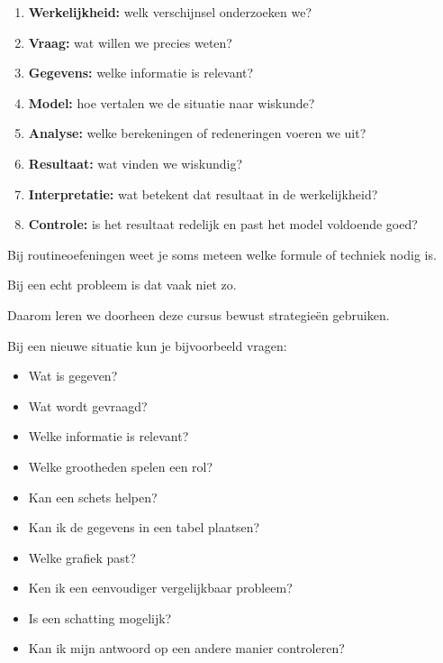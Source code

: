 \documentclass{ximera}
\begin{document}
\begin{oefening}{\oefU \ESS}
\begin{oefening}{\oefB \ESS}
\begin{opmerking}
\begin{enumerate}
  \item \textbf{Werkelijkheid:} welk verschijnsel onderzoeken we?
  \item \textbf{Vraag:} wat willen we precies weten?
  \item \textbf{Gegevens:} welke informatie is relevant?
  \item \textbf{Model:} hoe vertalen we de situatie naar wiskunde?
  \item \textbf{Analyse:} welke berekeningen of redeneringen voeren we uit?
  \item \textbf{Resultaat:} wat vinden we wiskundig?
  \item \textbf{Interpretatie:} wat betekent dat resultaat in de werkelijkheid?
  \item \textbf{Controle:} is het resultaat redelijk en past het model voldoende goed?
\end{enumerate}




Bij routineoefeningen weet je soms meteen welke formule of techniek
nodig is.

Bij een echt probleem is dat vaak niet zo.

Daarom leren we doorheen deze cursus bewust strategieën gebruiken.

Bij een nieuwe situatie kun je bijvoorbeeld vragen:

\begin{itemize}
  \item Wat is gegeven?
  \item Wat wordt gevraagd?
  \item Welke informatie is relevant?
  \item Welke grootheden spelen een rol?
  \item Kan een schets helpen?
  \item Kan ik de gegevens in een tabel plaatsen?
  \item Welke grafiek past?
  \item Ken ik een eenvoudiger vergelijkbaar probleem?
  \item Is een schatting mogelijk?
  \item Kan ik mijn antwoord op een andere manier controleren?
\end{itemize}


\end{opmerking}
\end{oefening}
\end{oefening}
\end{document}
